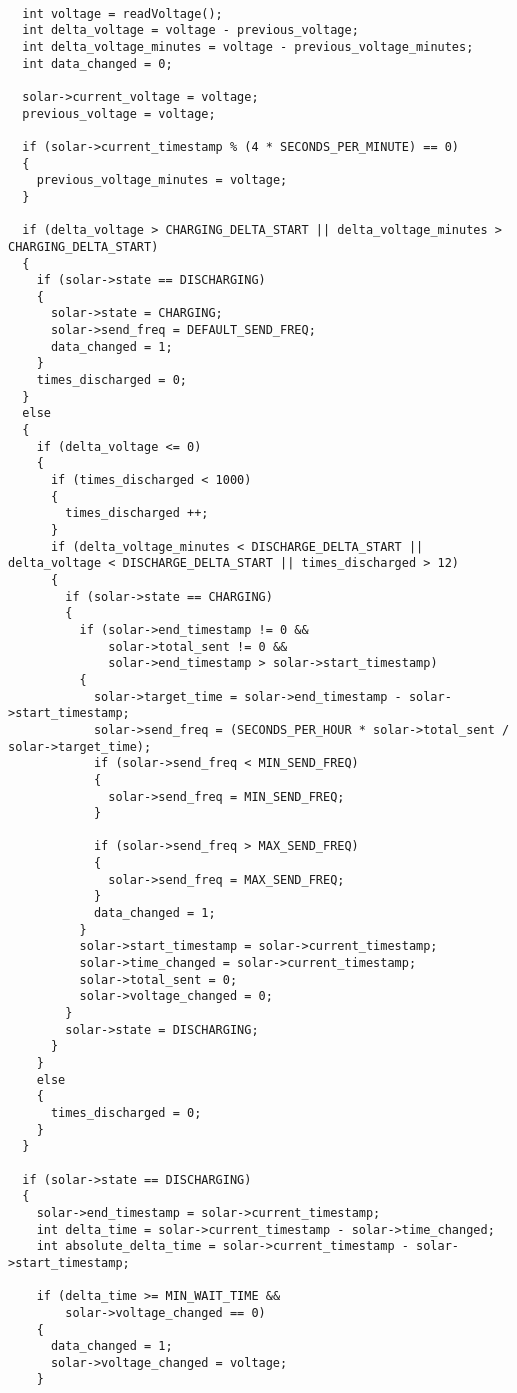 \lstset{language=C}
\begin{lstlisting}[frame=single]

  int voltage = readVoltage();
  int delta_voltage = voltage - previous_voltage;
  int delta_voltage_minutes = voltage - previous_voltage_minutes;
  int data_changed = 0;

  solar->current_voltage = voltage;
  previous_voltage = voltage;

  if (solar->current_timestamp % (4 * SECONDS_PER_MINUTE) == 0)
  {
    previous_voltage_minutes = voltage;
  }

  if (delta_voltage > CHARGING_DELTA_START || delta_voltage_minutes > CHARGING_DELTA_START)
  {
    if (solar->state == DISCHARGING)
    {
      solar->state = CHARGING;
      solar->send_freq = DEFAULT_SEND_FREQ;
      data_changed = 1;
    }
    times_discharged = 0;
  }
  else
  {
    if (delta_voltage <= 0)
    {
      if (times_discharged < 1000)
      {
        times_discharged ++;
      }
      if (delta_voltage_minutes < DISCHARGE_DELTA_START || delta_voltage < DISCHARGE_DELTA_START || times_discharged > 12)
      {
        if (solar->state == CHARGING)
        {
          if (solar->end_timestamp != 0 &&
              solar->total_sent != 0 &&
              solar->end_timestamp > solar->start_timestamp)
          {
            solar->target_time = solar->end_timestamp - solar->start_timestamp;
            solar->send_freq = (SECONDS_PER_HOUR * solar->total_sent / solar->target_time);
            if (solar->send_freq < MIN_SEND_FREQ)
            {
              solar->send_freq = MIN_SEND_FREQ;
            }

            if (solar->send_freq > MAX_SEND_FREQ)
            {
              solar->send_freq = MAX_SEND_FREQ;
            }
            data_changed = 1;
          }
          solar->start_timestamp = solar->current_timestamp;
          solar->time_changed = solar->current_timestamp;
          solar->total_sent = 0;
          solar->voltage_changed = 0;
        }
        solar->state = DISCHARGING;
      }
    }
    else
    {
      times_discharged = 0;
    }
  }

  if (solar->state == DISCHARGING)
  {
    solar->end_timestamp = solar->current_timestamp;
    int delta_time = solar->current_timestamp - solar->time_changed;
    int absolute_delta_time = solar->current_timestamp - solar->start_timestamp;

    if (delta_time >= MIN_WAIT_TIME &&
        solar->voltage_changed == 0)
    {
      data_changed = 1;
      solar->voltage_changed = voltage;
    }



\end{lstlisting}
